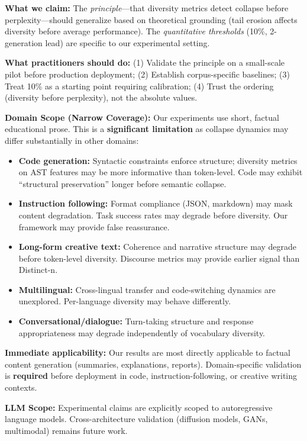 \documentclass[conference]{IEEEtran}
\begin{document}
\textbf{What we claim:} The \textit{principle}---that diversity metrics detect collapse before perplexity---should generalize based on theoretical grounding (tail erosion affects diversity before average performance). The \textit{quantitative thresholds} (10\%, 2-generation lead) are specific to our experimental setting.

\textbf{What practitioners should do:} (1) Validate the principle on a small-scale pilot before production deployment; (2) Establish corpus-specific baselines; (3) Treat 10\% as a starting point requiring calibration; (4) Trust the ordering (diversity before perplexity), not the absolute values.

\textbf{Domain Scope (Narrow Coverage):} Our experiments use short, factual educational prose. This is a \textbf{significant limitation} as collapse dynamics may differ substantially in other domains:

\begin{itemize}
    \item \textbf{Code generation:} Syntactic constraints enforce structure; diversity metrics on AST features may be more informative than token-level. Code may exhibit ``structural preservation'' longer before semantic collapse.
    \item \textbf{Instruction following:} Format compliance (JSON, markdown) may mask content degradation. Task success rates may degrade before diversity. Our framework may provide false reassurance.
    \item \textbf{Long-form creative text:} Coherence and narrative structure may degrade before token-level diversity. Discourse metrics may provide earlier signal than Distinct-n.
    \item \textbf{Multilingual:} Cross-lingual transfer and code-switching dynamics are unexplored. Per-language diversity may behave differently.
    \item \textbf{Conversational/dialogue:} Turn-taking structure and response appropriateness may degrade independently of vocabulary diversity.
\end{itemize}

\textbf{Immediate applicability:} Our results are most directly applicable to factual content generation (summaries, explanations, reports). Domain-specific validation is \textbf{required} before deployment in code, instruction-following, or creative writing contexts.

\textbf{LLM Scope:} Experimental claims are explicitly scoped to autoregressive language models. Cross-architecture validation (diffusion models, GANs, multimodal) remains future work.
\end{document}
